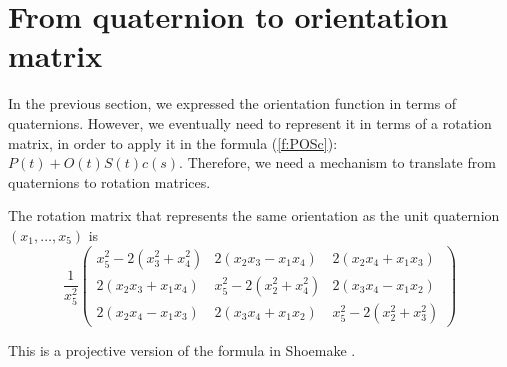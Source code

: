 \section{From quaternion to orientation matrix}
\label{sec:rotmatrix}

In the previous section, we expressed the orientation function in terms
of quaternions.
However, we eventually need to represent it in terms of a rotation matrix,
in order to apply it in the formula (\ref{f:POSc}): $P(t) + O(t)S(t)c(s)$.
Therefore, we need a mechanism to translate from quaternions to
rotation matrices.

\begin{lemma}
\label{lem:qtorot}
The rotation matrix that represents the same orientation as the 
unit quaternion $(x_1,\ldots,x_5)$ is
\begin{equation}
	\frac{1}{x_5^2}
	\left( \begin{array}{ccc}
	x_5^2 - 2(x_3^2 + x_4^2)& 2(x_2x_3 - x_1x_4)	& 2(x_2x_4 + x_1x_3) \\
	2(x_2x_3 + x_1x_4)	& x_5^2-2(x_2^2 + x_4^2)& 2(x_3x_4 - x_1x_2) \\
	2(x_2x_4 - x_1x_3)	& 2(x_3x_4 + x_1x_2)	& x_5^2-2(x_2^2 + x_3^2)
	\end{array} \right)
\end{equation}
\end{lemma}
\prf
This is a projective version of the formula in Shoemake \cite{shoemake85}.
\QED

